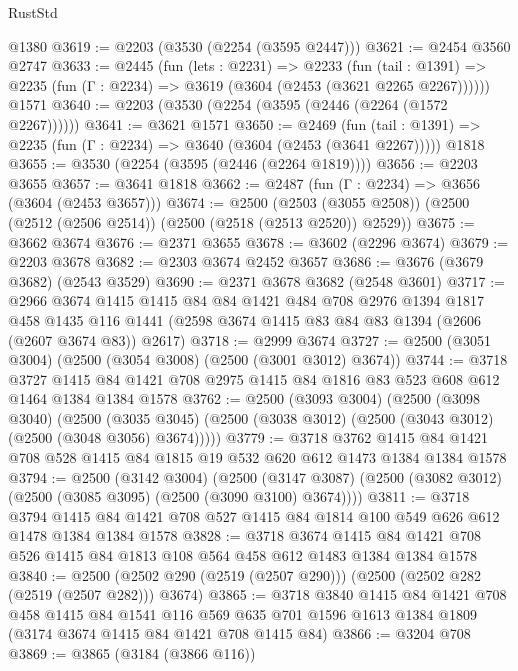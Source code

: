 \begin{lexlean}{RustStd}
\begin{coremodule}
    @1380
@3619 := @2203 (@3530 (@2254 (@3595 @2447)))
@3621 := @2454 @3560 @2747
@3633 := @2445
    (fun (lets : @2231) =>
    @2233
      (fun (tail : @1391) => @2235 (fun (Γ : @2234) => @3619 (@3604 (@2453 (@3621 @2265 @2267))))))
    @1571
@3640 := @2203 (@3530 (@2254 (@3595 (@2446 (@2264 (@1572 @2267))))))
@3641 := @3621 @1571
@3650 := @2469
    (fun (tail : @1391) => @2235 (fun (Γ : @2234) => @3640 (@3604 (@2453 (@3641 @2267)))))
    @1818
@3655 := @3530 (@2254 (@3595 (@2446 (@2264 @1819))))
@3656 := @2203 @3655
@3657 := @3641 @1818
@3662 := @2487 (fun (Γ : @2234) => @3656 (@3604 (@2453 @3657)))
@3674 := @2500
    (@2503 (@3055 @2508))
    (@2500 (@2512 (@2506 @2514)) (@2500 (@2518 (@2513 @2520)) @2529))
@3675 := @3662 @3674
@3676 := @2371 @3655
@3678 := @3602 (@2296 @3674)
@3679 := @2203 @3678
@3682 := @2303 @3674 @2452 @3657
@3686 := @3676 (@3679 @3682) (@2543 @3529)
@3690 := @2371 @3678 @3682 (@2548 @3601)
@3717 := @2966
    @3674
    @1415
    @1415
    @84
    @84
    @1421
    @484
    @708
    @2976
    @1394
    @1817
    @458
    @1435
    @116
    @1441
    (@2598 @3674 @1415 @83 @84 @83 @1394 (@2606 (@2607 @3674 @83)) @2617)
@3718 := @2999 @3674
@3727 := @2500 (@3051 @3004) (@2500 (@3054 @3008) (@2500 (@3001 @3012) @3674))
@3744 := @3718
    @3727
    @1415
    @84
    @1421
    @708
    @2975
    @1415
    @84
    @1816
    @83
    @523
    @608
    @612
    @1464
    @1384
    @1384
    @1578
@3762 := @2500
    (@3093 @3004)
    (@2500
      (@3098 @3040)
      (@2500 (@3035 @3045) (@2500 (@3038 @3012) (@2500 (@3043 @3012) (@2500 (@3048 @3056) @3674)))))
@3779 := @3718
    @3762
    @1415
    @84
    @1421
    @708
    @528
    @1415
    @84
    @1815
    @19
    @532
    @620
    @612
    @1473
    @1384
    @1384
    @1578
@3794 := @2500
    (@3142 @3004)
    (@2500 (@3147 @3087) (@2500 (@3082 @3012) (@2500 (@3085 @3095) (@2500 (@3090 @3100) @3674))))
@3811 := @3718
    @3794
    @1415
    @84
    @1421
    @708
    @527
    @1415
    @84
    @1814
    @100
    @549
    @626
    @612
    @1478
    @1384
    @1384
    @1578
@3828 := @3718
    @3674
    @1415
    @84
    @1421
    @708
    @526
    @1415
    @84
    @1813
    @108
    @564
    @458
    @612
    @1483
    @1384
    @1384
    @1578
@3840 := @2500 (@2502 @290 (@2519 (@2507 @290))) (@2500 (@2502 @282 (@2519 (@2507 @282))) @3674)
@3865 := @3718
    @3840
    @1415
    @84
    @1421
    @708
    @458
    @1415
    @84
    @1541
    @116
    @569
    @635
    @701
    @1596
    @1613
    @1384
    @1809
    (@3174 @3674 @1415 @84 @1421 @708 @1415 @84)
@3866 := @3204 @708
@3869 := @3865 (@3184 (@3866 @116))

\end{coremodule}
\end{lexlean}
